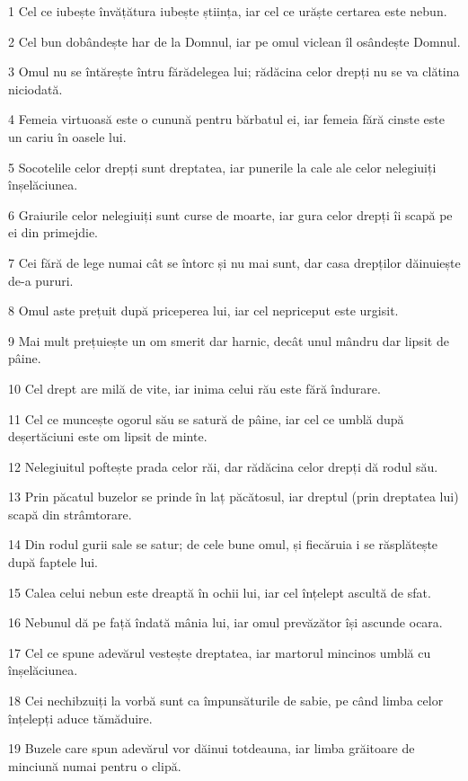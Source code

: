 \par 1 Cel ce iubește învățătura iubește știința, iar cel ce urăște certarea este nebun.
\par 2 Cel bun dobândește har de la Domnul, iar pe omul viclean îl osândește Domnul.
\par 3 Omul nu se întărește întru fărădelegea lui; rădăcina celor drepți nu se va clătina niciodată.
\par 4 Femeia virtuoasă este o cunună pentru bărbatul ei, iar femeia fără cinste este un cariu în oasele lui.
\par 5 Socotelile celor drepți sunt dreptatea, iar punerile la cale ale celor nelegiuiți înșelăciunea.
\par 6 Graiurile celor nelegiuiți sunt curse de moarte, iar gura celor drepți îi scapă pe ei din primejdie.
\par 7 Cei fără de lege numai cât se întorc și nu mai sunt, dar casa drepților dăinuiește de-a pururi.
\par 8 Omul aste prețuit după priceperea lui, iar cel nepriceput este urgisit.
\par 9 Mai mult prețuiește un om smerit dar harnic, decât unul mândru dar lipsit de pâine.
\par 10 Cel drept are milă de vite, iar inima celui rău este fără îndurare.
\par 11 Cel ce muncește ogorul său se satură de pâine, iar cel ce umblă după deșertăciuni este om lipsit de minte.
\par 12 Nelegiuitul poftește prada celor răi, dar rădăcina celor drepți dă rodul său.
\par 13 Prin păcatul buzelor se prinde în laț păcătosul, iar dreptul (prin dreptatea lui) scapă din strâmtorare.
\par 14 Din rodul gurii sale se satur; de cele bune omul, și fiecăruia i se răsplătește după faptele lui.
\par 15 Calea celui nebun este dreaptă în ochii lui, iar cel înțelept ascultă de sfat.
\par 16 Nebunul dă pe față îndată mânia lui, iar omul prevăzător își ascunde ocara.
\par 17 Cel ce spune adevărul vestește dreptatea, iar martorul mincinos umblă cu înșelăciunea.
\par 18 Cei nechibzuiți la vorbă sunt ca împunsăturile de sabie, pe când limba celor înțelepți aduce tămăduire.
\par 19 Buzele care spun adevărul vor dăinui totdeauna, iar limba grăitoare de minciună numai pentru o clipă.
